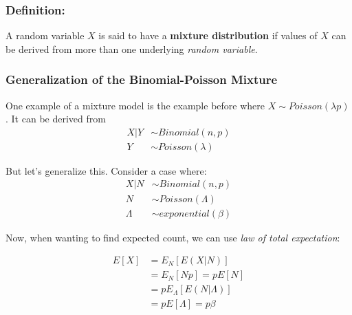 \documentclass{article}
\begin{document}
\subsubsection*{Definition:}

A random variable $X$ is said to have a \textbf{mixture distribution} if values of $X$ can be derived from more than one underlying \textit{random variable}. 

\subsubsection{Generalization of the Binomial-Poisson Mixture}

One example of a mixture model is the example before where $X \sim Poisson(\lambda p)$. It can be derived from 
\begin{equation*}
    \begin{split}
        X|Y &\sim Binomial(n,p)\\
        Y &\sim Poisson(\lambda)
    \end{split}
\end{equation*}

But let's generalize this. Consider a case where:
\begin{equation*}
    \begin{split}
        X|N &\sim Binomial(n,p)\\
        N &\sim Poisson(\Lambda)\\
        \Lambda &\sim exponential(\beta)
    \end{split}
\end{equation*}

\noindent Now, when wanting to find expected count, we can use \textit{law of total expectation}:

\begin{equation*}
    \begin{split}
        E[X] &= E_N[E(X|N)]\\
            &= E_N[Np] = pE[N]\\
            &= p E_\Lambda [E(N|\Lambda)]\\
            &= pE[\Lambda] = p \beta
    \end{split}
\end{equation*}
\end{document}
